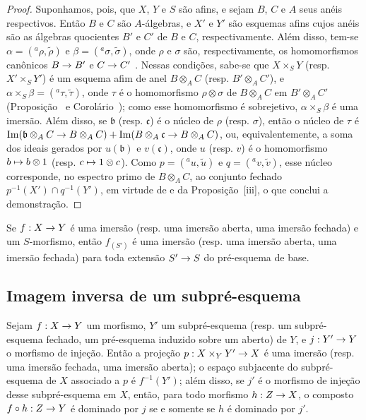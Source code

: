 \documentclass[oneside]{amsart}
\makeatletter
\newcommand{\ega@arrow}[2]{\mathchoice{#1}{#2}{#2}{#2}}
\let\ega@shortmapsto\mapsto
\renewcommand{\to}{\ega@arrow{\longrightarrow}{\rightarrow}}
\renewcommand{\mapsto}{\ega@arrow{\longmapsto}{\ega@shortmapsto}}
\let\EGAOriginalLabel\label
\renewcommand{\label}[1]{\phantomsection\EGAOriginalLabel{#1}}
\makeatother
\begin{document}
\begin{proof}
Suponhamos, pois, que $X$, $Y$ e $S$ são afins, e sejam $B$, $C$ e $A$ seus anéis respectivos.
Então $B$ e $C$ são $A$-álgebras, e $X'$ e $Y'$ são esquemas afins cujos anéis são as álgebras quocientes $B'$ e $C'$ de $B$ e $C$, respectivamente.
Além disso, tem-se $\alpha=({}^a\rho,\widetilde{\rho})$ e $\beta=({}^a\sigma,\widetilde{\sigma})$, onde $\rho$ e $\sigma$ são, respectivamente, os homomorfismos canônicos $B\to B'$ e $C\to C'$ .
Nessas condições, sabe-se que $X\times_S Y$ (resp. $X'\times_S Y'$) é um esquema afim de anel $B\otimes_A C$ (resp. $B'\otimes_A C'$), e $\alpha\times_S\beta=({}^a\tau,\widetilde{\tau})$, onde $\tau$ é o homomorfismo $\rho\otimes\sigma$ de $B\otimes_A C$ em $B'\otimes_A C'$ (Proposição~ e Corolário~);
como esse homomorfismo é sobrejetivo, $\alpha\times_S\beta$ é uma imersão.
Além disso, se $\mathfrak{b}$ (resp. $\mathfrak{c}$) é o núcleo de $\rho$ (resp. $\sigma$), então o núcleo de $\tau$ é
$\operatorname{Im}(\mathfrak{b}\otimes_A C\to B\otimes_A C)+\operatorname{Im}(B\otimes_A\mathfrak{c}\to B\otimes_A C)$,
ou, equivalentemente, a soma dos ideais gerados por $u(\mathfrak{b})$ e $v(\mathfrak{c})$, onde $u$ (resp. $v$) é o homomorfismo $b\mapsto b\otimes 1$ (resp. $c\mapsto 1\otimes c$).
Como $p=({}^a u,\widetilde{u})$ e $q=({}^a v,\widetilde{v})$, esse núcleo corresponde, no espectro primo de $B\otimes_A C$, ao conjunto fechado $p^{-1}(X')\cap q^{-1}(Y')$, em virtude de  e da Proposição~[iii], o que conclui a demonstração.
\end{proof}

\begin{corollary}[4.3.2]
\label{I.4.3.2}
Se $f:X\to Y$ é uma imersão (resp. uma imersão aberta, uma imersão fechada) e um $S$-morfismo, então $f_{(S')}$ é uma imersão (resp. uma imersão aberta, uma imersão fechada) para toda extensão $S'\to S$ do pré-esquema de base.
\end{corollary}

\subsection{Imagem inversa de um subpré-esquema}
\label{subsection:I.4.4}

\begin{proposition}[4.4.1]
\label{I.4.4.1}
Sejam $f:X\to Y$ um morfismo, $Y'$ um subpré-esquema (resp. um subpré-esquema fechado, um pré-esquema induzido sobre um aberto) de $Y$, e $j:Y'\to Y$ o morfismo de injeção.
Então a projeção $p:X\times_Y Y'\to X$ é uma imersão (resp. uma imersão fechada, uma imersão aberta);
o espaço subjacente do subpré-esquema de $X$ associado a $p$ é $f^{-1}(Y')$;
além disso, se $j'$ é o morfismo de injeção desse subpré-esquema em $X$, então, para todo morfismo $h:Z\to X$, o composto $f\circ h:Z\to Y$ é dominado por $j$ se e somente se $h$ é dominado por $j'$.
\end{proposition}
\end{document}

